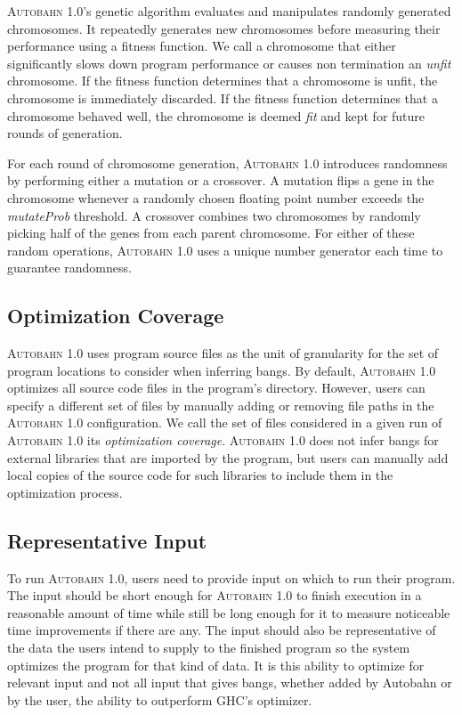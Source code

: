 \documentclass[format=sigplan, review=true, 9pt]{acmart}
\newcommand{\unfit}[0]{unfit}
\newcommand{\Ao}[0]{\textsc{Autobahn 1.0}}
\newcommand{\fit}[0]{fit}
\begin{document}
\Ao{}'s genetic algorithm evaluates and manipulates randomly generated
chromosomes. It repeatedly generates new chromosomes before measuring
their performance using a fitness function. We call a chromosome that
either significantly slows down program performance or causes non
termination an \textit{\unfit{}} chromosome. If the fitness function
determines that a chromosome is \unfit{}, the chromosome is
immediately discarded. If the fitness function determines that a
chromosome behaved well, the chromosome is deemed \textit{\fit{}} and
kept for future rounds of generation.

For each round of chromosome generation, \Ao{} introduces randomness
by performing either a mutation or a crossover. A mutation flips a
gene in the chromosome whenever a randomly chosen floating point
number exceeds the \textit{mutateProb} threshold. A crossover combines
two chromosomes by randomly picking half of the genes from each parent
chromosome. For either of these random operations, \Ao{} uses a unique
number generator each time to guarantee randomness.

\subsection{Optimization Coverage}
\Ao{} uses program source files as the unit of granularity for 
the set of program locations to consider when inferring bangs.  By
default, \Ao{} optimizes all source code files in the program's
directory. However, users can specify a different set of files by
manually adding or removing file paths in the \Ao{} configuration.
We call the set of files considered in a given run of \Ao{}
its \textit{optimization coverage}.
\Ao{} does not infer bangs for external libraries
that are imported by the program, but users can manually add local
copies of the source code for such libraries to include them in the optimization process.


\subsection{Representative Input}
To run \Ao{}, users need to provide input on which to run their
program. The input should be short enough for \Ao{} to finish
execution in a reasonable amount of time while still be long enough
for it to measure noticeable time improvements if there are
any.  The input should also be representative of the data the users
intend to supply to the finished program so the system optimizes the
program for that kind of data.  It is this ability to optimize for
relevant input and not all input that gives bangs, whether added by
Autobahn or by the user, the ability to outperform GHC's optimizer. 
\end{document}
